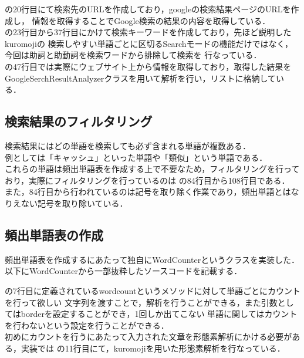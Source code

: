 の20行目にて検索先のURLを作成しており，googleの検索結果ページのURLを作成し，
情報を取得することでGoogle検索の結果の内容を取得している．\\

の23行目から37行目にかけて検索キーワードを作成しており，先ほど説明したkuromojiの
検索しやすい単語ごとに区切るSearchモードの機能だけではなく，今回は助詞と助動詞を検索ワードから排除して検索を
行なっている．\\

の47行目では実際にウェブサイト上から情報を取得しており，取得した結果を
GoogleSerchResultAnalyzerクラスを用いて解析を行い，リストに格納している．\\



\subsection{検索結果のフィルタリング}
検索結果にはどの単語を検索しても必ず含まれる単語が複数ある．\\
例としては「キャッシュ」といった単語や「類似」という単語である．\\
これらの単語は頻出単語表を作成する上で不要なため，フィルタリングを行っており，実際にフィルタリングを行っているのは
の84行目から108行目である．
また，84行目から行われているのは記号を取り除く作業であり，頻出単語とはなりえない記号を取り除いている．\\

\subsection{頻出単語表の作成}
頻出単語表を作成するにあたって独自にWordCounterというクラスを実装した．\\

以下にWordCounterから一部抜粋したソースコードを記載する．



の7行目に定義されているwordcountというメソッドに対して単語ごとにカウントを行って欲しい
文字列を渡すことで，解析を行うことができる，また引数としてはborderを設定することができ，1回しか出てこない
単語に関してはカウントを行わないという設定を行うことができる．\\

初めにカウントを行うにあたって入力された文章を形態素解析にかける必要がある，実装では
の11行目にて，kuromojiを用いた形態素解析を行なっている．
\\

